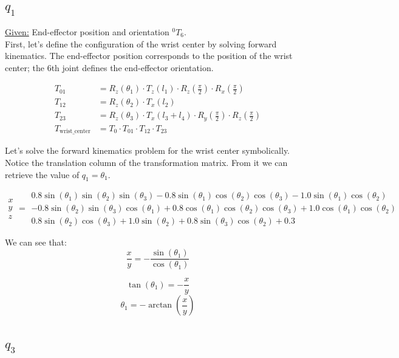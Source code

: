 \documentclass{article}
\begin{document}
\subsection{$q_1$}

\underline{Given:} End-effector position and orientation ${}^0T_6$.\\

First, let's define the configuration of the wrist center by solving forward kinematics. 
The end-effector position corresponds to the position of the wrist center; 
the 6th joint defines the end-effector orientation. 

\begin{align*}
    T_{01} &= R_z(\theta_1) \cdot T_z(l_1) \cdot R_z(\frac{\pi}{2}) \cdot R_x(\frac{\pi}{2}) \\
    T_{12} &= R_z(\theta_2) \cdot T_x(l_2) \\
    T_{23} &= R_z(\theta_3) \cdot T_x(l_3 + l_4) \cdot R_y(\frac{\pi}{2}) \cdot R_z(\frac{\pi}{2}) \\
    T_{\text{wrist\_center}} &= T_0 \cdot T_{01} \cdot T_{12} \cdot T_{23}
\end{align*}

Let's solve the forward kinematics problem for the wrist center symbolically.
Notice the translation column of the transformation matrix.  
From it we can retrieve the value of $q_1 = \theta_1$.


\[
\begin{smallmatrix}
    x \\ y \\ z
\end{smallmatrix}
=
\begin{smallmatrix}
    0.8 \sin(\theta_1) \sin(\theta_2) \sin(\theta_3) - 0.8 \sin(\theta_1) \cos(\theta_2) \cos(\theta_3) - 1.0 \sin(\theta_1) \cos(\theta_2) \\
    -0.8 \sin(\theta_2) \sin(\theta_3) \cos(\theta_1) + 0.8 \cos(\theta_1) \cos(\theta_2) \cos(\theta_3) + 1.0 \cos(\theta_1) \cos(\theta_2) \\
    0.8 \sin(\theta_2) \cos(\theta_3) + 1.0 \sin(\theta_2) + 0.8 \sin(\theta_3) \cos(\theta_2) + 0.3
\end{smallmatrix}
\]

We can see that:
\[\frac{x}{y} = -\frac{\sin(\theta_1)}{\cos(\theta_1)}\]

\[\tan(\theta_1) = -\dfrac{x}{y}\]
\[\theta_1 = -\arctan(\dfrac{x}{y})\]

\subsection{$q_3$}
\end{document}

